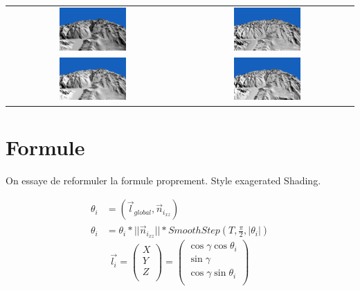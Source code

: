 \documentclass[a4paper]{article}
\begin{document}
\begin{tabular}{cc}
\includegraphics[width=0.4\textwidth]{Images/Essais/Essai_16_phong.png}&
\includegraphics[width=0.4\textwidth]{Images/Essais/Essai_16_details.png}\\
\includegraphics[width=0.4\textwidth]{Images/Essais/Essai_16_overlay_remap.png}&
\includegraphics[width=0.4\textwidth]{Images/Essais/Essai_16_watercolor.png}\\
\end{tabular}


 
 
 
 
\section{Formule}
On essaye de reformuler la formule proprement. Style exagerated Shading.

\begin{align*}
\theta_i &= (\vec{l}_{global},\vec{n}_{i_{xz}}) \\
\theta_i &= \theta_i * ||\vec{n}_{i_{xz}}|| * SmoothStep(T,\frac{\pi}{2},|\theta_i|)
\end{align*}
\[
\vec{l_i} = 
\begin{pmatrix}
X \\
Y \\
Z \\
\end{pmatrix}
=
\begin{pmatrix}
\cos \gamma  \cos \theta_i\\
\sin \gamma \\
\cos \gamma  \sin \theta_i \\
\end{pmatrix}
\] 
\end{document}
